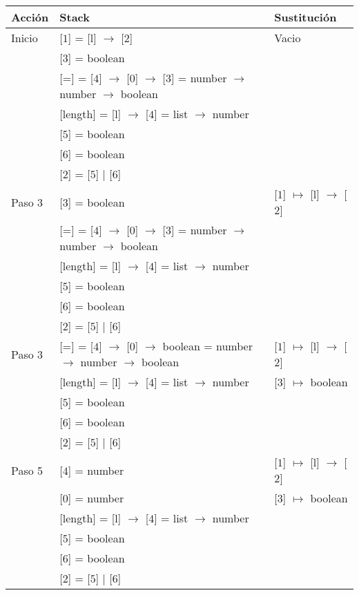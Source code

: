 \documentclass{article}
\begin{document}
\begin{center}
 \begin{longtable}{ | l | p{10 cm} | p{5 cm} | }
 \hline
 Acción & Stack & Sustitución \\ \hline \hline
 Inicio & [$\boxed{1}$] = [l] $\rightarrow$ [$\boxed{2}$] 				& Vacio	\\
	& [$\boxed{3}$] = boolean							&	\\
	& [=] = [$\boxed{4}$] $\rightarrow$ [0] $\rightarrow$ [$\boxed{3}$] =
	  number $\rightarrow$ number $\rightarrow$ boolean				&	\\
	& [length] = [l] $\rightarrow$ [$\boxed{4}$] =
	  list $\rightarrow$ number							&	\\ 
	& [$\boxed{5}$] = boolean							&	\\
	& [$\boxed{6}$] = boolean							&	\\
	& [$\boxed{2}$] = [$\boxed{5}$] $|$ [$\boxed{6}$]				&	\\ \hline
	 
 Paso 3 & [$\boxed{3}$] = boolean							& [$\boxed{1}$] $\mapsto$ [l] $\rightarrow$ [$\boxed{2}$] \\
	& [=] = [$\boxed{4}$] $\rightarrow$ [0] $\rightarrow$ [$\boxed{3}$] =
	  number $\rightarrow$ number $\rightarrow$ boolean				&	\\
	& [length] = [l] $\rightarrow$ [$\boxed{4}$] =
	  list $\rightarrow$ number							&	\\ 
	& [$\boxed{5}$] = boolean							&	\\
	& [$\boxed{6}$] = boolean							&	\\
	& [$\boxed{2}$] = [$\boxed{5}$] $|$ [$\boxed{6}$]				&	\\ \hline
	 
 Paso 3 & [=] = [$\boxed{4}$] $\rightarrow$ [0] $\rightarrow$ boolean =
	  number $\rightarrow$ number $\rightarrow$ boolean				& [$\boxed{1}$] $\mapsto$ [l] $\rightarrow$ [$\boxed{2}$] \\
	& [length] = [l] $\rightarrow$ [$\boxed{4}$] =
	  list $\rightarrow$ number							& [$\boxed{3}$] $\mapsto$ boolean \\ 
	& [$\boxed{5}$] = boolean							&	\\
	& [$\boxed{6}$] = boolean							&	\\
	& [$\boxed{2}$] = [$\boxed{5}$] $|$ [$\boxed{6}$]				&	\\ \hline
 
 Paso 5 & [$\boxed{4}$] = number							& [$\boxed{1}$] $\mapsto$ [l] $\rightarrow$ [$\boxed{2}$] \\
	& [0] = number									& [$\boxed{3}$] $\mapsto$ boolean \\ 
	& [length] = [l] $\rightarrow$ [$\boxed{4}$] =
	  list $\rightarrow$ number							&	\\
	& [$\boxed{5}$] = boolean							&	\\
	& [$\boxed{6}$] = boolean							&	\\
	& [$\boxed{2}$] = [$\boxed{5}$] $|$ [$\boxed{6}$]				&	\\ \hline
 

\end{longtable}
\end{center}
\end{document}
